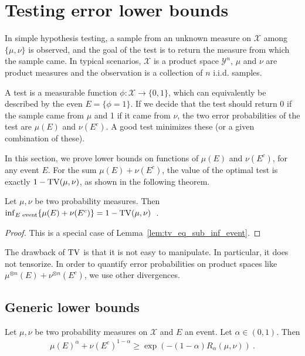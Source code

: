 \section{Testing error lower bounds}

In simple hypothesis testing, a sample from an unknown measure on $\mathcal X$ among $\{\mu, \nu\}$ is observed, and the goal of the test is to return the measure from which the sample came.
In typical scenarios, $\mathcal X$ is a product space $\mathcal Y^n$, $\mu$ and $\nu$ are product measures and the observation is a collection of $n$ i.i.d. samples.

A test is a measurable function $\phi : \mathcal X \to \{0,1\}$, which can equivalently be described by the even $E = \{\phi = 1\}$. If we decide that the test should return 0 if the sample came from $\mu$ and 1 if it came from $\nu$, the two error probabilities of the test are $\mu(E)$ and $\nu(E^c)$. A good test minimizes these (or a given combination of these).

In this section, we prove lower bounds on functions of $\mu(E)$ and $\nu(E^c)$, for any event $E$.
For the sum $\mu(E) + \nu(E^c)$, the value of the optimal test is exactly $1 - \operatorname{TV}(\mu, \nu)$, as shown in the following theorem.

\begin{theorem}
  \label{thm:testing_eq_tv}
  Let $\mu, \nu$ be two probability measures. Then $\inf_{E \text{ event}}\{\mu(E) + \nu(E^c)\} = 1 - \operatorname{TV}(\mu, \nu)$~.
\end{theorem}

\begin{proof}
This is a special case of Lemma~\ref{lem:tv_eq_sub_inf_event}.
\end{proof}

The drawback of $\operatorname{TV}$ is that it is not easy to manipulate. In particular, it does not tensorize. In order to quantify error probabilities on product spaces like $\mu^{\otimes n}(E) + \nu^{\otimes n}(E^c)$, we use other divergences.

\subsection{Generic lower bounds}

\begin{lemma}
  \label{lem:testing_bound_renyi_mean}
  Let $\mu, \nu$ be two probability measures on $\mathcal X$ and $E$ an event. Let $\alpha \in (0,1)$. Then
  \begin{align*}
  \mu(E)^\alpha + \nu(E^c)^{1 - \alpha}
  \ge \exp\left(-(1 - \alpha) R_{\alpha}(\mu, \nu)\right)
  \: .
  \end{align*}
\end{lemma}

